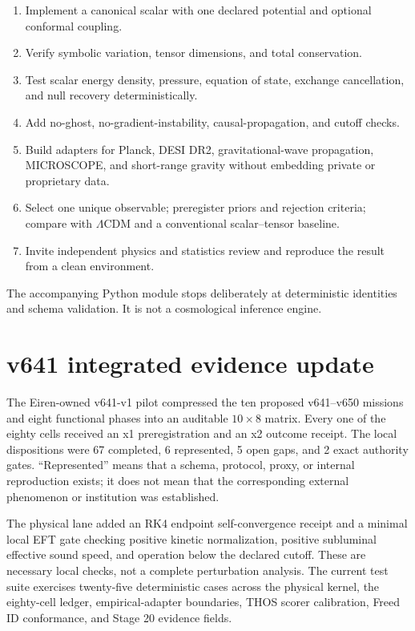 \documentclass[11pt]{article}
\begin{document}
\begin{enumerate}
\item Implement a canonical scalar with one declared potential and optional conformal coupling.
\item Verify symbolic variation, tensor dimensions, and total conservation.
\item Test scalar energy density, pressure, equation of state, exchange cancellation, and null recovery deterministically.
\item Add no-ghost, no-gradient-instability, causal-propagation, and cutoff checks.
\item Build adapters for Planck, DESI DR2, gravitational-wave propagation, MICROSCOPE, and short-range gravity without embedding private or proprietary data.
\item Select one unique observable; preregister priors and rejection criteria; compare with $\Lambda$CDM and a conventional scalar--tensor baseline.
\item Invite independent physics and statistics review and reproduce the result from a clean environment.
\end{enumerate}

The accompanying Python module stops deliberately at deterministic identities and schema validation. It is not a cosmological inference engine.

\section{v641 integrated evidence update}

The Eiren-owned v641-v1 pilot compressed the ten proposed v641--v650 missions and eight functional phases into an auditable $10\times8$ matrix. Every one of the eighty cells received an x1 preregistration and an x2 outcome receipt. The local dispositions were 67 completed, 6 represented, 5 open gaps, and 2 exact authority gates. ``Represented'' means that a schema, protocol, proxy, or internal reproduction exists; it does not mean that the corresponding external phenomenon or institution was established.

The physical lane added an RK4 endpoint self-convergence receipt and a minimal local EFT gate checking positive kinetic normalization, positive subluminal effective sound speed, and operation below the declared cutoff. These are necessary local checks, not a complete perturbation analysis. The current test suite exercises twenty-five deterministic cases across the physical kernel, the eighty-cell ledger, empirical-adapter boundaries, THOS scorer calibration, Freed ID conformance, and Stage 20 evidence fields.
\end{document}
